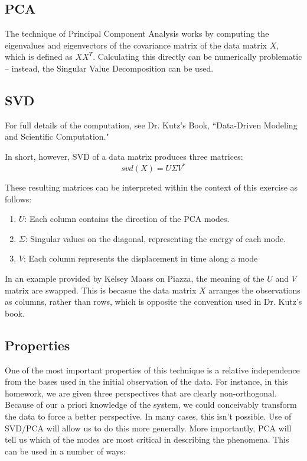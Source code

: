 \documentclass[journal]{IEEEtran}
\newcommand{\myMatrix}[1]{\bm{\mathit{#1}}}
\begin{document}
\subsection{PCA}
 The technique of Principal Component Analysis works by computing the eigenvalues and eigenvectors
 of the covariance matrix of the data matrix $ \myMatrix{X} $, which is defined as
 $ \myMatrix{X}\myMatrix{X}^{T} $. Calculating this directly can be numerically problematic --
 instead, the Singular Value Decomposition can be used.

 \subsection{SVD}
For full details of the computation, see Dr. Kutz's Book, ``Data-Driven Modeling and Scientific
Computation."

In short, however, SVD of a data matrix produces three matrices:
\begin{equation}
    svd(\myMatrix{X})=\myMatrix{U} \myMatrix{\Sigma} \myMatrix{V}^{*} 
\end{equation}

These resulting matrices can be interpreted within the context of this exercise as follows:
\begin{enumerate}
    \item $\myMatrix{U}$: Each column contains the direction of the PCA modes.
    \item $\myMatrix{\Sigma}$: Singular values on the diagonal, representing the energy of each mode.
    \item $\myMatrix{V}$: Each column represents the displacement in time along a mode
\end{enumerate}

In an example provided by Kelsey Maass on Piazza, the meaning of the $\myMatrix{U}$ and
$\myMatrix{V}$ matrix are swapped. This is becasue the data matrix $\myMatrix{X}$ arranges the
observations as columns, rather than rows, which is opposite the convention used in Dr. Kutz's
book.

\subsection{Properties}

One of the most important properties of this technique is a relative independence from the bases
used in the initial observation of the data. For instance, in this homework, we are given three
perspectives that are clearly non-orthogonal. Because of our a priori knowledge of the system, we
could conceivably transform the data to force a better perspective. In many cases, this isn't
possible. Use of SVD/PCA will allow us to do this more generally. More importantly, PCA will tell
us which of the modes are most critical in describing the phenomena. This can be used in a number
of ways:
\end{document}
